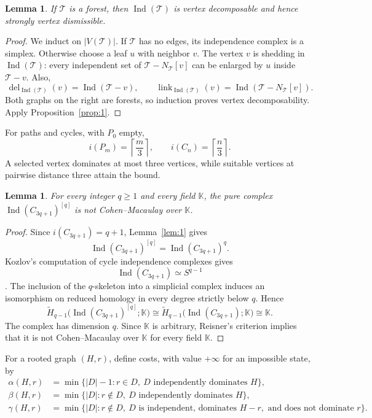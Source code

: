 \documentclass[11pt]{amsart}
\newcommand{\K}{\mathbb K}
\DeclareMathOperator{\link}{link}
\DeclareMathOperator{\del}{del}
\DeclareMathOperator{\Ind}{Ind}
\newtheorem{lemma}[theorem]{Lemma}
\theoremstyle{definition}
\begin{document}
	\begin{lemma}\label{lem:5}
		If $\mathcal T$ is a forest, then $\Ind(\mathcal T)$ is vertex decomposable and hence strongly vertex dismissible.
	\end{lemma}
	
	\begin{proof}
		We induct on $|V(\mathcal T)|$.  If $\mathcal T$ has no edges, its independence complex is a simplex. Otherwise choose a leaf $u$ with neighbor $v$.  The vertex $v$ is shedding in $\Ind(\mathcal T)$: every independent set of $\mathcal T-N_{\mathcal T}[v]$ can be enlarged by $u$ inside $\mathcal T-v$.  Also,
		\[
		\del_{\Ind(\mathcal T)}(v)=\Ind(\mathcal T-v),
		\qquad
		\link_{\Ind(\mathcal T)}(v)=\Ind(\mathcal T-N_{\mathcal T}[v]).
		\]
		Both graphs on the right are forests, so induction proves vertex decomposability.  Apply Proposition~\ref{prop:1}.
	\end{proof}
	
	For paths and cycles, with $P_0$ empty,
	\[
	i(P_m)=\left\lceil\frac m3\right\rceil,
	\qquad
	i(C_n)=\left\lceil\frac n3\right\rceil.
	\]
	A selected vertex dominates at most three vertices, while suitable vertices at pairwise distance three attain the bound.
	
	\begin{lemma}\label{lem:6}
		For every integer $q\geq1$ and every field $\K$, the pure complex $\Ind(C_{3q+1})^{[q]}$ is not Cohen--Macaulay over $\K$.
	\end{lemma}
	
	\begin{proof}
		Since $i(C_{3q+1})=q+1$, Lemma~\ref{lem:1} gives
		\[
		\Ind(C_{3q+1})^{[q]}=\Ind(C_{3q+1})^q.
		\]
		Kozlov's computation of cycle independence complexes gives
		\[
		\Ind(C_{3q+1})\simeq S^{q-1}
		\]
		\cite[Proposition~5.2]{Kozlov1999}.  The inclusion of the $q$-skeleton into a simplicial complex induces an isomorphism on reduced homology in every degree strictly below $q$.  Hence
		\[
		\widetilde H_{q-1}\bigl(\Ind(C_{3q+1})^{[q]};\K\bigr)
		\cong
		\widetilde H_{q-1}\bigl(\Ind(C_{3q+1});\K\bigr)
		\cong \K.
		\]
		The complex has dimension $q$. Since $\K$ is arbitrary, Reisner's criterion implies that it is not Cohen--Macaulay over $\K$ for every field $\K$.
	\end{proof}
	
	For a rooted graph $(H,r)$, define costs, with value $+\infty$ for an impossible state, by
	\begin{align*}
		\alpha(H,r)&=\min\{|D|-1:r\in D,\ D\text{ independently dominates }H\},\\
		\beta(H,r)&=\min\{|D|:r\notin D,\ D\text{ independently dominates }H\},\\
		\gamma(H,r)&=\min\{|D|:r\notin D,\ D\text{ is independent, dominates }H-r,\text{ and does not dominate }r\}.
	\end{align*}
	
\end{document}
